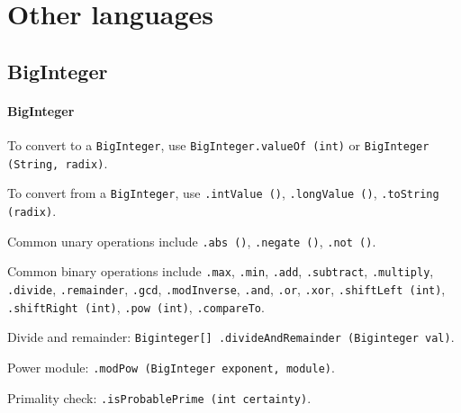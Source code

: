 \section{Other languages}

\subsection{BigInteger}
	\paragraph{BigInteger}
To convert to a \texttt{BigInteger}, use \texttt{BigInteger.valueOf (int)} or \texttt{BigInteger (String, radix)}.

To convert from a \texttt{BigInteger}, use \texttt{.intValue ()}, \texttt{.longValue ()}, \texttt{.toString (radix)}.

Common unary operations include \texttt{.abs ()}, \texttt{.negate ()}, \texttt{.not ()}.

Common binary operations include \texttt{.max}, \texttt{.min}, \texttt{.add}, \texttt{.subtract}, \texttt{.multiply}, \texttt{.divide}, \texttt{.remainder}, \texttt{.gcd}, \texttt{.modInverse}, \texttt{.and}, \texttt{.or}, \texttt{.xor}, \texttt{.shiftLeft (int)}, \texttt{.shiftRight (int)}, \texttt{.pow (int)}, \texttt{.compareTo}.

Divide and remainder: \texttt{Biginteger[] .divideAndRemainder (Biginteger val)}.

Power module: \texttt{.modPow (BigInteger exponent, module)}.

Primality check: \texttt{.isProbablePrime (int certainty)}.\newline

